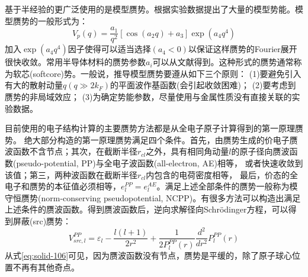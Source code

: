 基于半经验的更广泛使用的是模型赝势。根据实验数据提出了大量的模型势能\cite{PM9-451_1964,PM12-529_1965,JPF2-270_1972,PRB11-2717_1975,PRB11-2726_1975,JPF6-L271_1976,PR174-769_1968}。模型赝势的一般形式为：
\begin{equation}
  V_p(q)=\frac{a_1}{q^2}[\cos(a_2q)+a_3]\exp(a_4q^4)
  \label{eq:solid-102}
\end{equation}
加入$\exp(a_4q^4)$因子使得可以适当选择$(a_4<0)$以保证这样赝势的Fourier展开很快收敛。常用半导体材料的赝势参数$a_i$可以从文献\cite{PRB15-2154_1977}得到。这种形式的赝势通常称为软芯(softcore)势。一般说，推导模型赝势要遵从如下三个原则：
(1)要避免引入有大的散射动量$q(q\gg 2k_F)$的平面波作基函数(会引起收敛困难)；%
(2)要考虑到赝势的非局域效应；
(3)为确定势能参数，尽量使用与金属性质没有直接关联的实验数据。

目前使用的电子结构计算的主要赝势方法都是从全电子原子计算得到的第一原理赝势。%
绝大部分构造的第一原理赝势满足四个条件\cite{PRB12-4200_1975,PRB18-5449_1978,PRB19-568_1979,PRB20-4082_1979,PRB26-4199_1982,PRL43-1494_1979,JPC13-L189_1980,PRB32-8412_1985,PRB43-1993_1991}。首先，由赝势生成的价电子赝波函数不含节点；其次，在截断半径$r_{cl}$之外\cite{JPC13-L189_1980,PRB43-1993_1991}，具有相同角动量$l$的原子径向赝波函数(pseudo-potential, PP)与全电子波函数(all-electron, AE)相等，%
或者快速收敛到该值\cite{PRB18-5449_1978,PRL43-1494_1979,PRB32-8412_1985}；第三，两种波函数在截断半径$r_{cl}$内包含的电荷密度相等\cite{PRL43-1494_1979,PRB43-1993_1991}，
最后，价态的全电子和赝势的本征值必须相等，$e_l^{PP}=e_l^{AE}$。满足上述全部条件的赝势一般称为模守恒赝势(norm-conserving pseudopotential, NCPP)\cite{PRL43-1494_1979}。有很多方法可以构造出满足上述条件的赝波函数\cite{PRB18-5449_1978,PRB26-4199_1982,PRL43-1494_1979,JPC13-L189_1980,PRB32-8412_1985,PRB43-1993_1991}。得到赝波函数后，逆向求解径向Schr\"odinger方程，可以得到屏蔽(src)赝势：
\begin{equation}
  V_{src,l}^{PP}=\varepsilon_l-\frac{l(l+1)}{2r^2}+\frac1{2P_l^{PP}(r)}\frac{d^2}{dr^2}P_l^{PP}(r)
  \label{eq:solid-106}
\end{equation}
从式\eqref{eq:solid-106}可见，因为赝波函数没有节点，赝势是平缓的，除了原子球心位置不再有其他奇点。

